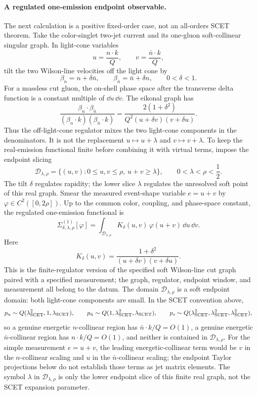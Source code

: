 \paragraph{A regulated one-emission endpoint observable.}
The next calculation is a positive fixed-order case, not an all-orders SCET
theorem.  Take the color-singlet two-jet current and its one-gluon
soft-collinear singular graph.  In light-cone variables
\[
  u=\frac{n\cdot k}{Q},\qquad
  v=\frac{\bar n\cdot k}{Q},
\]
tilt the two Wilson-line velocities off the light cone by
\[
  \beta_n=n+\delta\bar n,\qquad
  \beta_{\bar n}=\bar n+\delta n,\qquad
  0<\delta<1 .
\]
For a massless cut gluon, the on-shell phase space after the transverse
delta function is a constant multiple of \(\dd u\,\dd v\).  The eikonal graph
has
\[
  \frac{\beta_n\cdot\beta_{\bar n}}
       {(\beta_n\cdot k)(\beta_{\bar n}\cdot k)}
  =
  \frac{2(1+\delta^2)}
       {Q^2(u+\delta v)(v+\delta u)} .
\]
Thus the off-light-cone regulator mixes the two light-cone components in the
denominators.  It is not the replacement \(u\mapsto u+\lambda\) and
\(v\mapsto v+\lambda\).  To keep the real-emission functional finite before
combining it with virtual terms, impose the endpoint slicing
\[
  \mathcal D_{\lambda,\rho}
  =
  \{(u,v):0\le u,v\le\rho,\ u+v\ge\lambda\},
  \qquad
  0<\lambda<\rho<\frac12 .
\]
The tilt \(\delta\) regulates rapidity; the lower slice \(\lambda\) regulates
the unresolved soft point of this real graph.  Smear the measured event-shape
variable \(e=u+v\) by \(\varphi\in C^2([0,2\rho])\).  Up to the common color,
coupling, and phase-space constant, the regulated one-emission functional is
\begin{equation}
  \Sigma_{\delta,\lambda,\rho}^{(1)}[\varphi]
  =
  \int_{\mathcal D_{\lambda,\rho}}
  K_\delta(u,v)\,\varphi(u+v)
  \,\dd u\,\dd v .
  \label{eq:regulated-scet-one-emission-functional}
\end{equation}
Here
\[
  K_\delta(u,v)
  =
  \frac{1+\delta^2}{(u+\delta v)(v+\delta u)} .
\]
This is the finite-regulator version of the specified soft Wilson-line cut
graph paired with a specified measurement; the graph, regulator, endpoint
window, and measurement all belong to the datum.  The domain
\(\mathcal D_{\lambda,\rho}\) is a soft endpoint domain: both light-cone
components are small.  In the SCET convention above,
\[
  p_n\sim Q(\lambda_{\rm SCET}^2,1,\lambda_{\rm SCET}),
  \qquad
  p_{\bar n}\sim Q(1,\lambda_{\rm SCET}^2,\lambda_{\rm SCET}),
  \qquad
  p_s\sim Q(\lambda_{\rm SCET}^2,\lambda_{\rm SCET}^2,
  \lambda_{\rm SCET}^2),
\]
so a genuine energetic \(n\)-collinear region has
\(\bar n\cdot k/Q=O(1)\), a genuine energetic \(\bar n\)-collinear region has
\(n\cdot k/Q=O(1)\), and neither is contained in
\(\mathcal D_{\lambda,\rho}\).  For the simple measurement \(e=u+v\), the
leading energetic-collinear term would be \(v\) in the \(n\)-collinear scaling
and \(u\) in the \(\bar n\)-collinear scaling; the endpoint Taylor projections
below do not establish those terms as jet matrix elements.  The symbol
\(\lambda\) in
\(\mathcal D_{\lambda,\rho}\) is only the lower endpoint slice of this finite
real graph, not the SCET expansion parameter.

